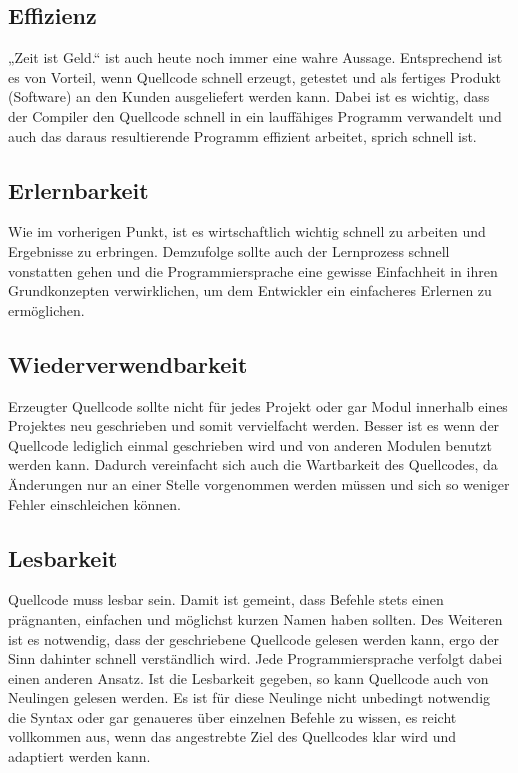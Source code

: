 \subsection{Effizienz}
\label{sec:Effizienz}
„Zeit ist Geld.“ ist auch heute noch immer eine wahre Aussage. Entsprechend ist es von Vorteil, wenn Quellcode schnell erzeugt, getestet und als fertiges Produkt (Software) an den Kunden ausgeliefert werden kann. Dabei ist es wichtig, dass der Compiler den Quellcode schnell in ein lauffähiges Programm verwandelt und auch das daraus resultierende Programm effizient arbeitet, sprich schnell ist.



\subsection{Erlernbarkeit}
\label{sec:Erlernbarkeit}
Wie im vorherigen Punkt, ist es wirtschaftlich wichtig schnell zu arbeiten und Ergebnisse zu erbringen. Demzufolge sollte auch der Lernprozess schnell vonstatten gehen und die Programmiersprache eine gewisse Einfachheit in ihren Grundkonzepten verwirklichen, um dem Entwickler ein einfacheres Erlernen zu ermöglichen.



\subsection{Wiederverwendbarkeit}
\label{sec:Wiederverwendbarkeit}
Erzeugter Quellcode sollte nicht für jedes Projekt oder gar Modul innerhalb eines Projektes neu geschrieben und somit vervielfacht werden. Besser ist es wenn der Quellcode lediglich einmal geschrieben wird und von anderen Modulen benutzt werden kann. Dadurch vereinfacht sich auch die Wartbarkeit des Quellcodes, da Änderungen nur an einer Stelle vorgenommen werden müssen und sich so weniger Fehler einschleichen können.



\subsection{Lesbarkeit}
\label{sec:Lesbarkeit}
Quellcode muss lesbar sein. Damit ist gemeint, dass Befehle stets einen prägnanten, einfachen und möglichst kurzen Namen haben sollten. Des Weiteren ist es notwendig, dass der geschriebene Quellcode gelesen werden kann, ergo der Sinn dahinter schnell verständlich wird. Jede Programmiersprache verfolgt dabei einen anderen Ansatz. Ist die Lesbarkeit gegeben, so kann Quellcode auch von Neulingen gelesen werden. Es ist für diese Neulinge nicht unbedingt notwendig die Syntax oder gar genaueres über einzelnen Befehle zu wissen, es reicht vollkommen aus, wenn das angestrebte Ziel des Quellcodes klar wird und adaptiert werden kann.



